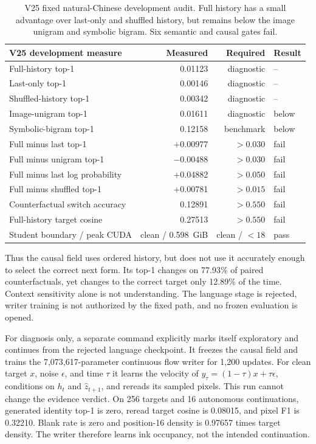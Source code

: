 \documentclass[11pt]{article}
\begin{document}
\begin{table}[t]
\centering
\small
\begin{tabular}{lrrl}
\toprule
V25 development measure & Measured & Required & Result \\
\midrule
Full-history top-1 & 0.01123 & diagnostic & -- \\
Last-only top-1 & 0.00146 & diagnostic & -- \\
Shuffled-history top-1 & 0.00342 & diagnostic & -- \\
Image-unigram top-1 & 0.01611 & diagnostic & below \\
Symbolic-bigram top-1 & 0.12158 & benchmark & below \\
Full minus last top-1 & +0.00977 & $>0.030$ & fail \\
Full minus unigram top-1 & $-0.00488$ & $>0.030$ & fail \\
Full minus last log probability & +0.04882 & $>0.050$ & fail \\
Full minus shuffled top-1 & +0.00781 & $>0.015$ & fail \\
Counterfactual switch accuracy & 0.12891 & $>0.550$ & fail \\
Full-history target cosine & 0.27513 & $>0.550$ & fail \\
Student boundary / peak CUDA & clean / 0.598~GiB & clean / $<18$ & pass \\
\bottomrule
\end{tabular}
\caption{V25 fixed natural-Chinese development audit. Full history has a
small advantage over last-only and shuffled history, but remains below the
image unigram and symbolic bigram. Six semantic and causal gates fail.}
\label{tab:v25language}
\end{table}

Thus the causal field uses ordered history, but does not use it accurately
enough to select the correct next form. Its top-1 changes on 77.93\% of paired
counterfactuals, yet changes to the correct target only 12.89\% of the time.
Context sensitivity alone is not understanding. The language stage is
rejected, writer training is not authorized by the fixed path, and no frozen
evaluation is opened.

For diagnosis only, a separate command explicitly marks itself exploratory and
continues from the rejected language checkpoint. It freezes the causal field
and trains the 7,073,617-parameter continuous flow writer for 1,200 updates.
For clean target $x$, noise $\epsilon$, and time $\tau$ it learns the velocity
of $y_\tau=(1-\tau)x+\tau\epsilon$, conditions on $h_t$ and $\hat z_{t+1}$,
and rereads its sampled pixels. This run cannot change the evidence verdict.
On 256 targets and 16 autonomous continuations, generated identity top-1 is
zero, reread target cosine is 0.08015, and pixel F1 is 0.32210. Blank rate is
zero and position-16 density is 0.97657 times target density. The writer
therefore learns ink occupancy, not the intended continuation.
\end{document}

